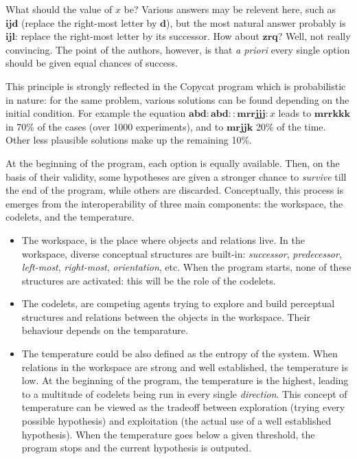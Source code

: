 What should the value of $x$ be? Various answers may be relevent here, such as
$\mathbf{ijd}$ (replace the right-most letter by $\mathbf{d}$), but the most
natural answer probably is $\mathbf{ijl}$: replace the right-most letter by its
successor. How about $\mathbf{zrq}$? Well, not really convincing. The point of
the authors, however, is that \textit{a priori} every single option should be
given equal chances of success.

This principle is strongly reflected in the Copycat program which is
probabilistic in nature: for the same problem, various solutions can be found
depending on the initial condition. For example the  equation $\mathbf{abd} :
\mathbf{abd} :: \mathbf{mrrjjj} : x$ leads to $\mathbf{mrrkkk}$ in 70\% of the
cases (over 1000 experiments), and to $\mathbf{mrjjk}$ 20\% of the time. Other
less plausible solutions make up the remaining 10\%.

At the beginning of the program, each option is equally available.  Then, on
the basis of their validity, some hypotheses are given a stronger chance to
\textit{survive} till the end of the program, while others are discarded.
Conceptually, this process is emerges from the interoperability of three main
components: the workspace, the codelets, and the temperature.

\begin{itemize}
    \item The workspace, is the place where objects and relations live.
      In the workspace, diverse conceptual structures are built-in:
      \textit{successor}, \textit{predecessor}, \textit{left-most},
      \textit{right-most}, \textit{orientation}, etc. When the program starts, none of these
      structures are activated: this will be the role of the codelets.
    \item The codelets, are competing agents trying to explore and build
      perceptual structures and relations between the objects in the workspace.
      Their behaviour depends on the temparature.
    \item The temperature could be also defined as the entropy of the
      system. When relations in the workspace are strong and well established,
      the temperature is low. At the beginning of the program, the temperature
      is the highest, leading to a multitude of codelets being run in every
      single \textit{direction}. This concept of temperature can be viewed as
      the tradeoff between exploration (trying every possible hypothesis) and
      exploitation (the actual use of a well established hypothesis). When the
      temperature goes below a given threshold, the program stops and the
      current hypothesis is outputed.
\end{itemize}

